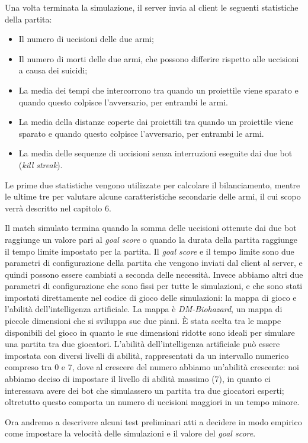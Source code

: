 \documentclass[12pt, italian]{toptesi}
\begin{document}
Una volta terminata la simulazione, il server invia al client le seguenti statistiche della partita:
\begin{itemize}
\item Il numero di uccisioni delle due armi;
\item Il numero di morti delle due armi, che possono differire rispetto alle uccisioni a causa dei suicidi;
\item La media dei tempi che intercorrono tra quando un proiettile viene sparato e quando questo colpisce l'avversario, per entrambi le armi.
\item La media della distanze coperte dai proiettili tra quando un proiettile viene sparato e quando questo colpisce l'avversario, per entrambi le armi.
\item La media delle sequenze di uccisioni senza interruzioni eseguite dai due bot (\emph{kill streak}).
\end{itemize}
Le prime due statistiche vengono utilizzate per calcolare il bilanciamento, mentre le ultime tre per valutare alcune caratteristiche secondarie delle armi, il cui scopo verrà descritto nel capitolo 6.

Il match simulato termina quando la somma delle uccisioni ottenute dai due bot raggiunge un valore pari al \emph{goal score} o quando la durata della partita raggiunge il tempo limite impostato per la partita.
Il \emph{goal score} e il tempo limite sono due parametri di configurazione della partita che vengono inviati dal client al server, e quindi possono essere cambiati a seconda delle necessità.
Invece abbiamo altri due parametri di configurazione che sono fissi per tutte le simulazioni, e che sono stati impostati direttamente nel codice di gioco delle simulazioni: la mappa di gioco e l'abilità dell'intelligenza artificiale.
La mappa è \emph{DM-Biohazard}, un mappa di piccole dimensioni che si sviluppa sue due piani. \`E stata scelta tra le mappe disponibili del gioco in quanto le sue dimensioni ridotte sono ideali per simulare una partita tra due giocatori.
L'abilità dell'intelligenza artificiale può essere impostata con diversi livelli di abilità, rappresentati da un intervallo numerico compreso tra 0 e 7, dove al crescere del numero abbiamo un'abilità crescente: noi abbiamo deciso di impostare il livello di abilità massimo (7), in quanto ci interessava avere dei bot che simulassero un partita tra due giocatori esperti; oltretutto questo comporta un numero di uccisioni maggiori in un tempo minore.

Ora andremo a descrivere alcuni test preliminari atti a decidere in modo empirico come impostare la velocità delle simulazioni e il valore del \emph{goal score}.
\end{document}
